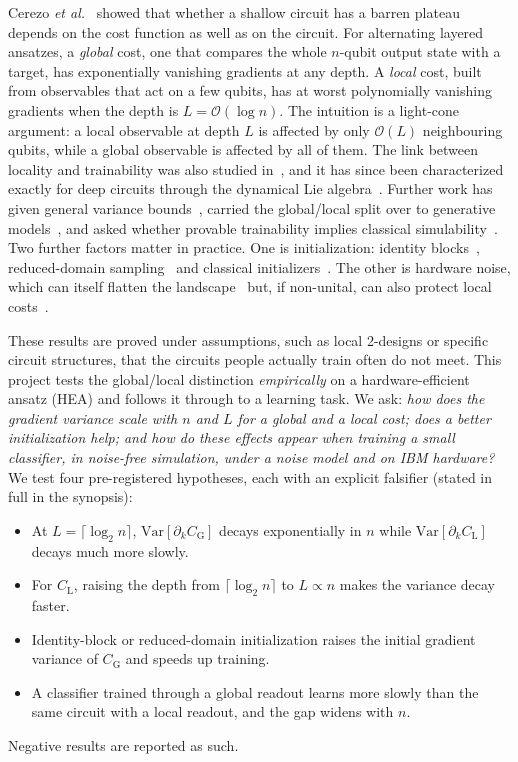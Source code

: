 \documentclass[conference]{IEEEtran}
\newcommand{\Var}{\mathrm{Var}}
\newcommand{\CG}{C_{\mathrm{G}}}
\newcommand{\CL}{C_{\mathrm{L}}}
\begin{document}
Cerezo \emph{et al.}~\cite{cerezo2021} showed that whether a shallow circuit
has a barren plateau depends on the cost function as well as on the circuit. For
alternating layered ansatzes, a \emph{global} cost, one that compares the
whole $n$-qubit output state with a target, has exponentially vanishing
gradients at any depth. A \emph{local} cost, built from observables that act on
a few qubits, has at worst polynomially vanishing gradients when the depth is
$L=\mathcal{O}(\log n)$. The intuition is a light-cone argument: a local
observable at depth $L$ is affected by only $\mathcal{O}(L)$ neighbouring
qubits, while a global observable is affected by all of them. The link between
locality and trainability was also studied in~\cite{uvarov2021}, and it has since been
characterized exactly for deep circuits through the dynamical Lie
algebra~\cite{ragone2024,fontana2024}. Further work has given general variance
bounds~\cite{zhang2024,letcher2024}, carried the global/local split over to
generative models~\cite{rudolph2024}, and asked whether provable trainability
implies classical simulability~\cite{cerezo2025}. Two further factors matter in
practice. One is initialization: identity blocks~\cite{grant2019},
reduced-domain sampling~\cite{wangqi2024} and classical
initializers~\cite{kashif2024date,kashif2024icrc}. The other is hardware noise,
which can itself flatten the landscape~\cite{wang2021,singkanipa2025} but, if
non-unital, can also protect local costs~\cite{mele2026,sannia2024}.

These results are proved under assumptions, such as local 2-designs or
specific circuit structures, that the circuits people actually train often do not
meet. This project tests the global/local distinction \emph{empirically} on a
hardware-efficient ansatz (HEA) and follows it through to a learning task. We
ask: \emph{how does the gradient variance scale with $n$ and $L$ for a global
and a local cost; does a better initialization help; and how do these effects
appear when training a small classifier, in noise-free simulation, under a
noise model and on IBM hardware?} We test four pre-registered hypotheses, each with an explicit
falsifier (stated in full in the synopsis):
\begin{itemize}
\item[\textbf{H1}] At $L=\lceil\log_2 n\rceil$, $\Var[\partial_k\CG]$ decays
exponentially in $n$ while $\Var[\partial_k\CL]$ decays much more slowly.
\item[\textbf{H2}] For $\CL$, raising the depth from $\lceil\log_2 n\rceil$
to $L\propto n$ makes the variance decay faster.
\item[\textbf{H3}] Identity-block or reduced-domain initialization raises the
initial gradient variance of $\CG$ and speeds up training.
\item[\textbf{H4}] A classifier trained through a global readout learns more
slowly than the same circuit with a local readout, and the gap widens with $n$.
\end{itemize}
Negative results are reported as such.
\end{document}
